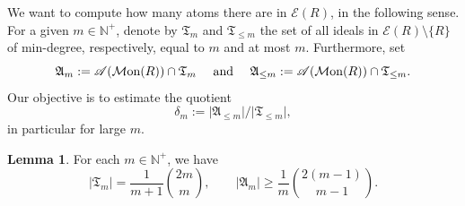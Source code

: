 \documentclass[a4paper,10pt,reqno]{amsart}
\theoremstyle{definition}
\newtheorem{lemma}[theorem]{Lemma}
\theoremstyle{definition}
\providecommand\Mon{{\mathcal{M}{\rm on}}}
\begin{document}
We want to compute how many atoms there are in $\mathcal E(R)$, in the following sense. For a given $m\in\mathbb N^+$, denote by $\mathfrak T_m$ and $\mathfrak T_{\le m}$ the set of all ideals in $\mathcal E(R)\setminus\{R\}$ of min-degree, respectively, equal to $m$ and at most $m$. Furthermore, set 
\[\mathfrak A_m:=\mathscr A(\Mon(R))\cap\mathfrak T_m \quad\text{ and }\quad \mathfrak A_{\le m}:=\mathscr A(\Mon(R))\cap\mathfrak T_{\le m}.\] 
Our objective is to estimate the quotient \[\delta_m:={\lvert \mathfrak A_{\le m} \rvert}/{\lvert \mathfrak T_{\le m} \rvert},\] in particular for large $m$.

\begin{lemma}\label{lem: densita equigen}
    For each $m\in\mathbb N^+$, we have
    \[ \lvert \mathfrak T_m \rvert = \frac{1}{m+1}\binom{2m}{m},\qquad\lvert \mathfrak A_m \rvert \ge \frac{1}{m}\binom{2(m-1)}{m-1}. \]
\end{lemma}
\end{document}
